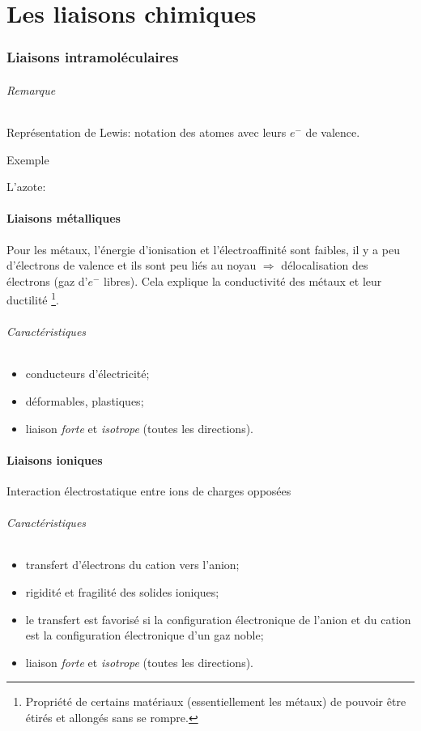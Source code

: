 \part{Les liaisons chimiques}
\section{Liaisons intramoléculaires}
\paragraph{Remarque} Représentation de Lewis: notation des atomes avec leurs $e^-$ de valence.

\subparagraph{Exemple} L'azote:\hspace{0.7cm} 

\subsection{Liaisons métalliques}
Pour les métaux, l'énergie d'ionisation et l'électroaffinité sont faibles,
il y a peu d'électrons de valence et ils sont peu liés au noyau $\Rightarrow$
délocalisation des électrons (gaz d'$e^-$ libres).
Cela explique la conductivité des métaux et leur ductilité
\footnote{Propriété de certains matériaux (essentiellement les métaux)
de pouvoir être étirés et allongés sans se rompre.}.
\paragraph{Caractéristiques}
\begin{itemize}
	\item conducteurs d'électricité;
	\item déformables, plastiques;
	\item liaison \emph{forte} et \emph{isotrope} (toutes les directions).
\end{itemize}

\subsection{Liaisons ioniques}
Interaction électrostatique entre ions de charges opposées
\paragraph{Caractéristiques}
\begin{itemize}
	\item transfert d'électrons du cation vers l'anion;
	\item rigidité et fragilité des solides ioniques;
	\item le transfert est favorisé si la configuration électronique de l'anion
		et du cation est la configuration électronique d'un gaz noble;
	\item liaison \emph{forte} et \emph{isotrope} (toutes les directions).
\end{itemize}

